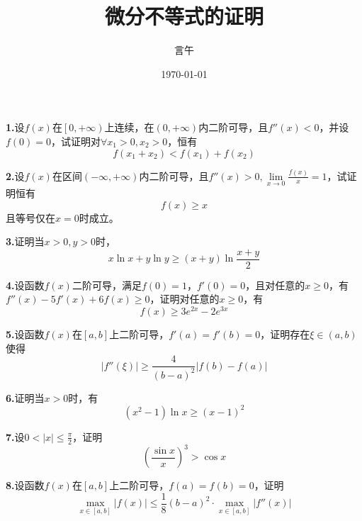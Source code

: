 \documentclass[10pt]{article}
\title{微分不等式的证明}
\author{言午}
\date{\today}
\begin{document}
\maketitle
\textbf{1.}设$f\left( x \right)$在$\left[ 0,+\infty \right)$上连续，在$\left( 0,+\infty \right)$内二阶可导，且$f''\left( x \right) <0$，并设$f\left( 0 \right) =0$，试证明对$\forall x_1>0,x_2>0$，恒有
\begin{equation*}
	f\left( x_1+x_2 \right) <f\left( x_1 \right) +f\left( x_2 \right)
\end{equation*}

\textbf{2.}设$f\left( x \right)$在区间$\left( -\infty ,+\infty \right)$内二阶可导，且$f''\left( x \right) >0,\lim\limits_{x\rightarrow 0} \frac{f\left( x \right)}{x}=1$，试证明恒有\[f\left( x \right) \ge x\]且等号仅在$x=0$时成立。

\textbf{3.}证明当$x>0,y>0$时，
\begin{equation*}
	x\ln x+y\ln y\ge \left( x+y \right) \ln \frac{x+y}{2}
\end{equation*}


\textbf{4.}设函数$f\left( x \right)$二阶可导，满足$f\left( 0 \right) =1$，$f'\left( 0 \right) =0$，且对任意的$x\ge 0$，有$f''\left( x \right) -5f'\left( x \right) +6f\left( x \right) \ge 0$，证明对任意的$x\ge 0$，有
$$
f\left( x \right) \ge 3e^{2x}-2e^{3x}
$$

\textbf{5.}设函数$f\left( x \right)$在$\left[ a,b \right]$上二阶可导，$f'\left( a \right) =f'\left( b \right) =0$，证明存在$\xi \in \left( a,b \right)$使得
\begin{equation*}
	\left| f''\left( \xi \right) \right|\ge \frac{4}{\left( b-a \right) ^2}\left| f\left( b \right) -f\left( a \right) \right|
\end{equation*}

\textbf{6.}证明当$x>0$时，有
$$
\left( x^2-1 \right) \ln x\ge \left( x-1 \right) ^2
$$

\textbf{7.}设$0<\left| x \right|\le \frac{\pi}{2}$，证明
$$
\left( \frac{\sin x}{x} \right) ^3>\cos x
$$

\textbf{8.}设函数$f\left( x \right)$在$\left[ a,b \right]$上二阶可导，$f\left( a \right) =f\left( b \right) =0$，证明
\begin{equation*}
	\mathop {\max} \limits_{x\in \left[a,b\right]}\left| f\left( x \right) \right|\le\frac{1}{8}\left(b-a\right) ^2\cdot \mathop {\max} \limits_{x\in \left[a,b \right]}\left|f''\left( x \right)\right|
\end{equation*}
\end{document}
